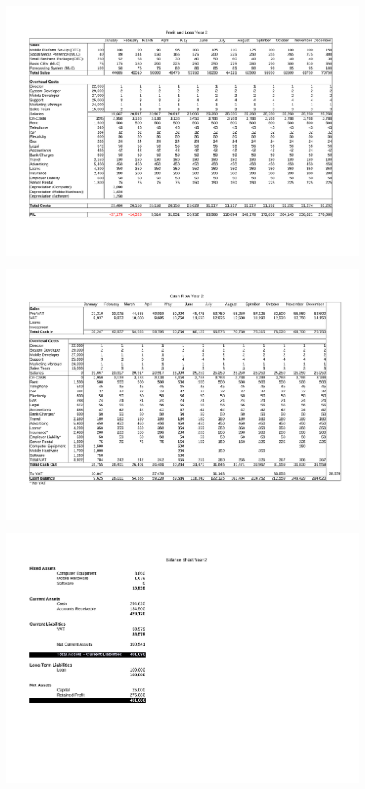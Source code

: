 \documentclass[DIV=calc, paper=a4, fontsize=11pt]{scrartcl}	 %
\begin{document}
\begin{landscape}
\includegraphics[width=\linewidth]{pl-y2.pdf}
\newpage\hfill\newpage

\includegraphics[width=\linewidth]{cashflow-y2.pdf}
\newpage\hfill\newpage

\includegraphics[width=\linewidth]{balance-y2.pdf}
\end{landscape}
\end{document}
